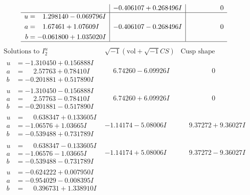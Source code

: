 \documentclass[1p]{elsarticle_modified}
\theoremstyle{definition}
\newcommand{\I}{\sqrt{-1}}
\begin{document}
$$\begin{array}{c|c|c}
 & -0.406107 + 0.268496 I & \phantom{-0.000000 } 0 \\ \hline\begin{aligned}
u &= \phantom{-}1.298140 - 0.069796 I \\
a &= \phantom{-}1.67461 + 1.07609 I \\
b &= -0.061800 + 1.035020 I\end{aligned}
 & -0.406107 - 0.268496 I & \phantom{-0.000000 } 0\\
 \hline 
 \end{array}$$\newpage$$\begin{array}{c|c|c}  
\text{Solutions to }I^u_{2}& \I (\text{vol} + \sqrt{-1}CS) & \text{Cusp shape}\\
 \hline 
\begin{aligned}
u &= -1.310450 + 0.156888 I \\
a &= \phantom{-}2.57763 + 0.78410 I \\
b &= -0.201881 + 0.517890 I\end{aligned}
 & \phantom{-}6.74260 - 6.09926 I & \phantom{-0.000000 } 0 \\ \hline\begin{aligned}
u &= -1.310450 - 0.156888 I \\
a &= \phantom{-}2.57763 - 0.78410 I \\
b &= -0.201881 - 0.517890 I\end{aligned}
 & \phantom{-}6.74260 + 6.09926 I & \phantom{-0.000000 } 0 \\ \hline\begin{aligned}
u &= \phantom{-}0.638347 + 0.133605 I \\
a &= -1.06576 + 1.03665 I \\
b &= -0.539488 + 0.731789 I\end{aligned}
 & -1.14174 - 5.08006 I & \phantom{-}9.37272 + 9.36027 I \\ \hline\begin{aligned}
u &= \phantom{-}0.638347 - 0.133605 I \\
a &= -1.06576 - 1.03665 I \\
b &= -0.539488 - 0.731789 I\end{aligned}
 & -1.14174 + 5.08006 I & \phantom{-}9.37272 - 9.36027 I \\ \hline\begin{aligned}
u &= -0.624222 + 0.007950 I \\
a &= -0.954029 - 0.008395 I \\
b &= \phantom{-}0.396731 + 1.338910 I\end{aligned}

\end{array}$$
\end{document}
